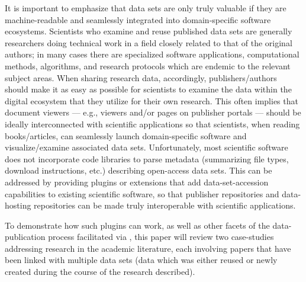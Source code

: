 \documentclass[12pt,letterpaper]{article}
\newcommand{\ATexttclr}[1]{\textcolor{tcolor}{\textbf{#1}}}
\newcommand{\textscc}[1]{{\color{orr!35!black}{{%
{\textsc{\textbf{#1}}}}}}}
\newcommand{\AcronymText}[1]{{\textscc{#1}}}
\newcommand{\SDRF}{\resizebox{!}{8pt}{\ATexttclr{S}}\resizebox{!}{8pt}{\ATexttclr{DR%
\hspace{1pt}{\raisebox{-1pt}{\fontfamily{qhv}\fontseries{b}\selectfont{}\Large{F}}%
}}}}
\newcommand{\HTML}{\resizebox{!}{8pt}{\AcronymText{HTML}}}
\newcommand{\PDF}{\resizebox{!}{8pt}{\AcronymText{PDF}}}
\newcommand{\p}[1]{

\vspace{.7em}#1}
\begin{document}
{\p{It is important to emphasize that data sets are only truly valuable if they are machine-readable and seamlessly integrated into domain-specific software ecosystems.  Scientists who examine and reuse published data sets are generally researchers doing technical work in a field closely related to that of the original authors; in many cases there are specialized software applications, computational methods, algorithms, and research protocols which are endemic to the relevant subject areas.  When sharing research data, accordingly, publishers/authors should make it as easy as possible for scientists to examine the data within the digital ecosystem that they utilize for their own research.  This often implies that document viewers --- e.g., \PDF{} viewers and/or \HTML{} pages on publisher portals --- should be ideally interconnected with scientific applications so that scientists, when reading books/articles, can seamlessly launch domain-specific software and visualize/examine associated data sets.  Unfortunately, most scientific software does not incorporate code libraries to parse metadata (summarizing file types, download instructions, etc.) describing open-access data sets.  This can be addressed by providing plugins or extensions that add data-set-accession capabilities to existing scientific software, so that publisher repositories and data-hosting repositories can be made truly interoperable with scientific applications.}

\p{To demonstrate how such plugins can work, as well as other facets of the data-publication process facilitated via \SDRF{}, this paper will review two case-studies addressing 
research in the academic literature, each involving papers that have been 
linked with multiple data sets (data which was either reused or newly created 
during the course of the research described).
}

\begin{figure}
\end{figure}}
\end{document}
